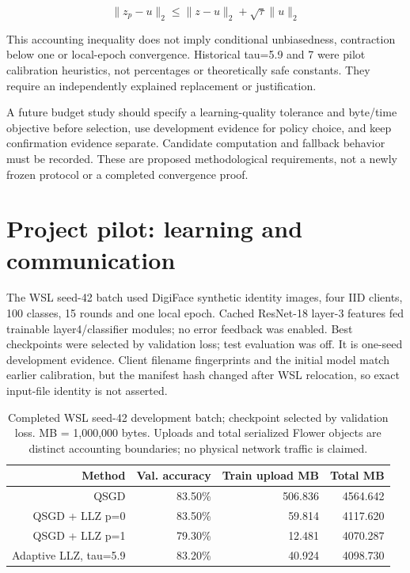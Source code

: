 \documentclass[11pt,a4paper]{article}
\begin{document}
\begin{equation*}\|z_p-u\|_2\leq\|z-u\|_2+\sqrt{\tau}\|u\|_2\end{equation*}

This accounting inequality does not imply conditional unbiasedness, contraction below one or local-epoch convergence. Historical tau=5.9 and 7 were pilot calibration heuristics, not percentages or theoretically safe constants. They require an independently explained replacement or justification.

A future budget study should specify a learning-quality tolerance and byte/time objective before selection, use development evidence for policy choice, and keep confirmation evidence separate. Candidate computation and fallback behavior must be recorded. These are proposed methodological requirements, not a newly frozen protocol or a completed convergence proof.

\section{Project pilot: learning and communication}

The WSL seed-42 batch used DigiFace synthetic identity images, four IID clients, 100 classes, 15 rounds and one local epoch. Cached ResNet-18 layer-3 features fed trainable layer4/classifier modules; no error feedback was enabled. Best checkpoints were selected by validation loss; test evaluation was off. It is one-seed development evidence. Client filename fingerprints and the initial model match earlier calibration, but the manifest hash changed after WSL relocation, so exact input-file identity is not asserted. \parencite{bae2023digiface}

\begin{table}[htbp]
\centering
\small
\begin{tabularx}{\textwidth}{R{1.60000}R{0.72000}R{0.88000}R{0.80000}}
\toprule
\textbf{Method} & \textbf{Val. accuracy} & \textbf{Train upload MB} & \textbf{Total MB} \\\midrule
QSGD & 83.50\% & 506.836 & 4564.642 \\
QSGD + LLZ p=0 & 83.50\% & 59.814 & 4117.620 \\
QSGD + LLZ p=1 & 79.30\% & 12.481 & 4070.287 \\
Adaptive LLZ, tau=5.9 & 83.20\% & 40.924 & 4098.730 \\
\bottomrule
\end{tabularx}
\caption{Completed WSL seed-42 development batch; checkpoint selected by validation loss. MB = 1,000,000 bytes. Uploads and total serialized Flower objects are distinct accounting boundaries; no physical network traffic is claimed.}
\label{tab:pilot}
\end{table}
\end{document}
